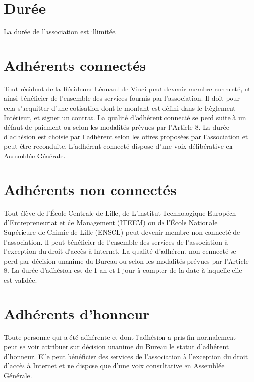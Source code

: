 \documentclass[12pt]{constitution}
\begin{document}
	\section{Durée}
	La durée de l'association est illimitée.


	\section{Adhérents connectés}
	Tout résident de la Résidence Léonard de Vinci peut devenir membre connecté, et ainsi bénéficier de l'ensemble des services fournis par l'association. Il doit pour cela s'acquitter d'une cotisation dont le montant est défini dans le Règlement Intérieur, et signer un contrat. La qualité d'adhérent connecté se perd suite à un défaut de paiement ou selon les modalités prévues par l'Article 8. La durée d'adhésion est choisie par l'adhérent selon les offres proposées par l'association et peut être reconduite. L'adhérent connecté dispose d'une voix délibérative en Assemblée Générale.

	\section{Adhérents non connectés}
	Tout élève de l'École Centrale de Lille, de L'Institut Technologique Européen d'Entrepreneuriat et de Management (ITEEM) ou de l'École Nationale Supérieure de Chimie de Lille (ENSCL) peut devenir membre non connecté de l'association. Il peut bénéficier de l'ensemble des services de l'association à l'exception du droit d'accès à Internet. La qualité d'adhérent non connecté se perd par décision unanime du Bureau ou selon les modalités prévues par l'Article 8. La durée d'adhésion est de 1 an et 1 jour à compter de la date à laquelle elle est validée.

	\section{Adhérents d'honneur}
	Toute personne qui a été adhérente et dont l'adhésion a pris fin normalement peut se voir attribuer sur décision unanime du Bureau le statut d'adhérent d'honneur. Elle peut bénéficier des services de l'association à l'exception du droit d'accès à Internet et ne dispose que d'une voix consultative en Assemblée Générale.
\end{document}
